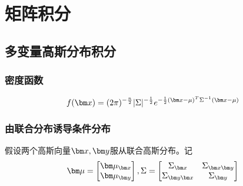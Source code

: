 \chapter{矩阵积分}

\section{多变量高斯分布积分}
\subsection{密度函数}
$$f(\bx)=(2\pi)^{-\frac{n}{2}}|\Sigma|^{-\frac{1}{2}}e^{-\frac{1}{2}(\bx-\mu)^T\Sigma^{-1}(\bx-\mu)}$$
\subsection{由联合分布诱导条件分布}
假设两个高斯向量$\bx,\by$服从联合高斯分布。记
\[
\bmu=\begin{bmatrix}
\bmu_{\bx}\\
\bmu_{\by}
\end{bmatrix},\Sigma=\begin{bmatrix}
\Sigma_{\bx}&\Sigma_{\bx\by}\\
\Sigma_{\by\bx}&\Sigma_{\by}
\end{bmatrix}
\]

